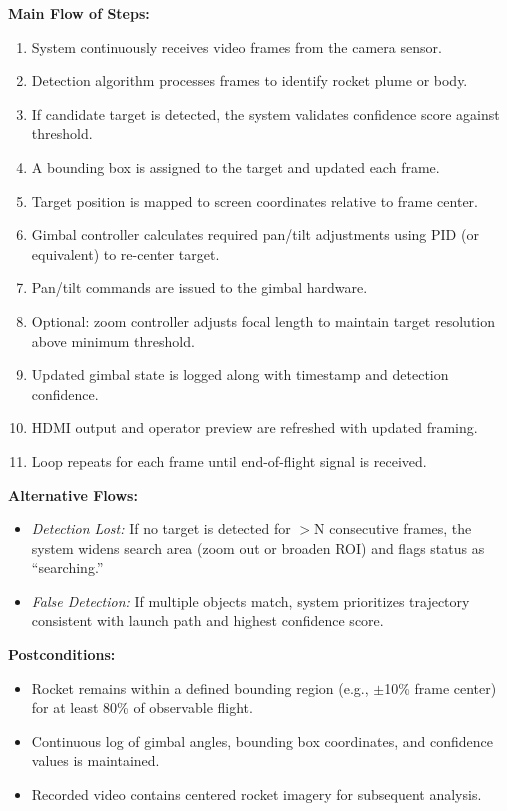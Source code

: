\documentclass[12pt]{article}
\begin{document}
\textbf{Main Flow of Steps:}
\begin{enumerate}
  \item System continuously receives video frames from the camera sensor.
  \item Detection algorithm processes frames to identify rocket plume or body.
  \item If candidate target is detected, the system validates confidence score against
        threshold.
  \item A bounding box is assigned to the target and updated each frame.
  \item Target position is mapped to screen coordinates relative to frame center.
  \item Gimbal controller calculates required pan/tilt adjustments using PID (or
        equivalent) to re-center target.
  \item Pan/tilt commands are issued to the gimbal hardware.
  \item Optional: zoom controller adjusts focal length to maintain target resolution
        above minimum threshold.
  \item Updated gimbal state is logged along with timestamp and detection confidence.
  \item HDMI output and operator preview are refreshed with updated framing.
  \item Loop repeats for each frame until end-of-flight signal is received.
\end{enumerate}

\textbf{Alternative Flows:}
\begin{itemize}
  \item \emph{Detection Lost:} If no target is detected for $>$N consecutive frames, the system widens search area (zoom out or broaden ROI) and flags status as ``searching.''
  \item \emph{False Detection:} If multiple objects match, system prioritizes trajectory consistent with launch path and highest confidence score.
\end{itemize}

\textbf{Postconditions:}
\begin{itemize}
  \item Rocket remains within a defined bounding region (e.g., $\pm$10\% frame center)
        for at least 80\% of observable flight.
  \item Continuous log of gimbal angles, bounding box coordinates, and confidence
        values is maintained.
  \item Recorded video contains centered rocket imagery for subsequent analysis.
\end{itemize}
\end{document}

